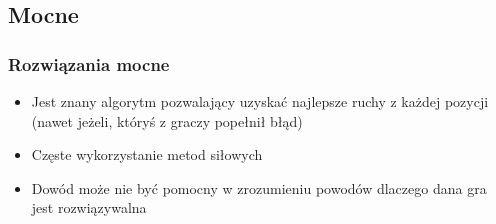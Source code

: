 \documentclass[polish,envcountsect,10pt]{beamer}
\begin{document}
        \subsection{Mocne}
            \begin{frame}
                \frametitle{Rozwiązania mocne}
                \begin{itemize}
                    \item<1-> Jest znany algorytm pozwalający uzyskać najlepsze ruchy z każdej pozycji (nawet jeżeli, któryś z graczy popełnił błąd)
                    \item<2-> Częste wykorzystanie metod siłowych
                    \item<3-> Dowód może nie być pomocny w zrozumieniu powodów dlaczego dana gra jest rozwiązywalna
                \end{itemize}
            \end{frame}
\end{document}
